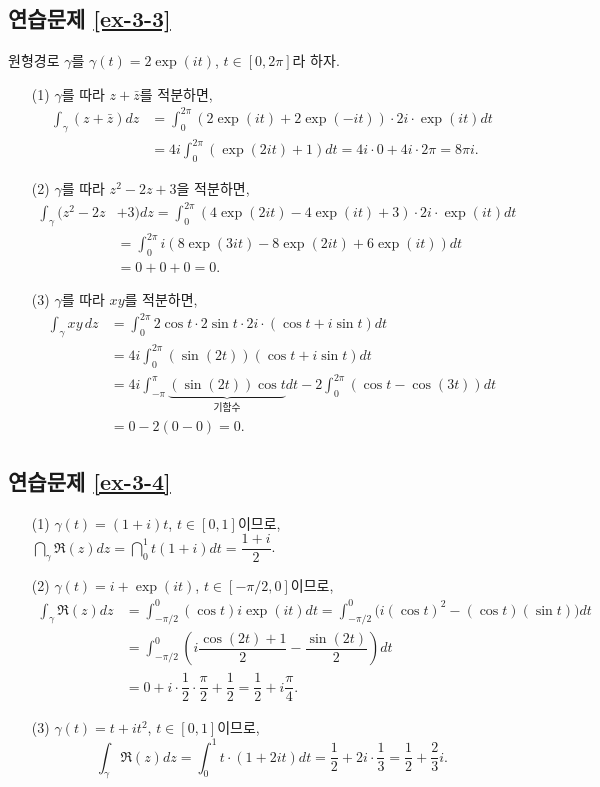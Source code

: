 \subsection*{연습문제 \ref{ex-3-3}}

원형경로 $\gamma$를 $\gamma(t) = 2\exp(it)$, $t\in[0,2\pi]$라 하자.
\begin{itemize}
\item[(1)] $\gamma$를 따라 $z+\bar z$를 적분하면,
\begin{align*}
\int_\gamma (z+\bar z) dz & = \int_0^{2\pi} (2\exp(it) + 2\exp(-it))\cdot 2i \cdot \exp(it) dt \\
&= 4i\int_0^{2\pi} (\exp(2it) +1)dt = 4i\cdot 0 + 4i\cdot 2\pi = 8\pi i.
\end{align*}
\item[(2)] $\gamma$를 따라 $z^2-2z +3$을 적분하면,
\begin{align*}
\int_\gamma (z^2-2z&+3) dz  = \int_0^{2\pi} (4\exp(2it) - 4\exp(it)+3)\cdot 2i \cdot \exp(it) dt \\
&= \int_0^{2\pi} i(8\exp(3it) - 8\exp(2it) + 6\exp(it))dt  \\
&= 0+0+0 =0.
\end{align*}
\item[(3)] $\gamma$를 따라 $xy$를 적분하면,
\begin{align*}
\int_\gamma xy\, dz & = \int_0^{2\pi}  2\cos t\cdot 2\sin t \cdot 2i \cdot(\cos t +i\sin t) dt \\
&= 4i\int_0^{2\pi} (\sin (2t))(\cos t + i\sin t)dt \\
&= 4i\int_{-\pi}^\pi \underbrace{(\sin(2t))\cos t}_{\text{기함수}} dt
- 2\int_0^{2\pi} (\cos t - \cos(3t))dt \\
&=0 - 2(0-0) = 0.
\end{align*}
\end{itemize}

\subsection*{연습문제 \ref{ex-3-4}}

\begin{itemize}
\item[(1)] $\gamma(t) =(1+i)t$, $t\in[0,1]$이므로,
$\dint_\gamma \Re(z)dz = \dint_0^1 t(1+i)dt = \dfrac{1+i}2$. 
\item[(2)] $\gamma(t) =i+\exp(it)$, $t\in[-\pi/2,0]$이므로, 
\begin{align*}
\int_\gamma \Re(z) dz &= \int_{-\pi/2}^0 (\cos t)i\exp(it)dt
= \int_{-\pi/2}^0 \Big(i(\cos t)^2 -(\cos t)(\sin t) \Big)dt \\
&= \int_{-\pi/2}^0 \left( i\dfrac{\cos(2t)+1}2 - \dfrac{\sin(2t)}2 \right) dt \\
&= 0 + i\cdot \dfrac12 \cdot \dfrac \pi2 + \dfrac12 = \dfrac12 + i\dfrac\pi4.
\end{align*}
\item[(3)] $\gamma(t) =t+it^ 2$, $t\in[0,1]$이므로,
\[
\int_\gamma \Re(z) dz  = \int_0^1 t\cdot(1+2it)dt = \dfrac12 + 2i\cdot\dfrac13 
=\dfrac12 + \dfrac23i.
\]
\end{itemize}

